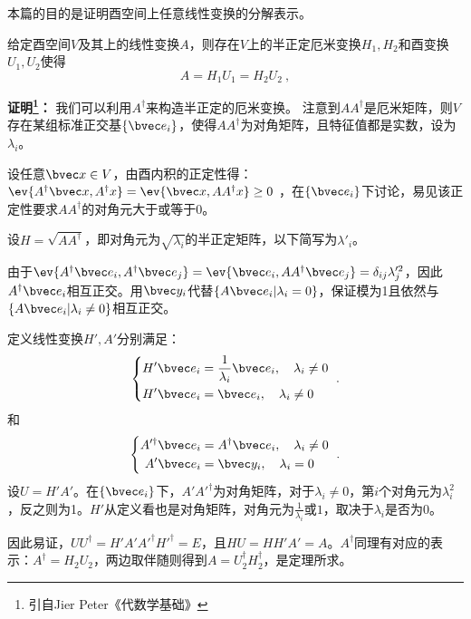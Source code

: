 本篇的目的是证明酉空间上任意线性变换的分解表示。
\begin{theorem}{}\label{the_PoDe_2}
给定酉空间$V$及其上的线性变换$A$，则存在$V$上的半正定厄米变换$H_1,H_2$和酉变换$U_1,U_2$使得
\begin{equation}
A=H_1U_1=H_2U_2~,
\end{equation}
\end{theorem}
\textbf{证明\footnote{引自Jier Peter《代数学基础》}：}
我们可以利用$A^{\dagger}$来构造半正定的厄米变换。
注意到$AA^{\dagger}$是厄米矩阵，则$V$存在某组标准正交基$\{\bvec e_i\}$，使得$AA^{\dagger}$为对角矩阵，且特征值都是实数，设为$\lambda_i$。

设任意$\bvec x\in V$，由酉内积的正定性得：$\ev{A^{\dagger}\bvec x,A^{\dagger}x}=\ev{\bvec x,AA^{\dagger}x}\ge 0$
，在$\{\bvec e_i\}$下讨论，易见该正定性要求$AA^{\dagger}$的对角元大于或等于0。

设$H=\sqrt{AA^{\dagger}}$，即对角元为$\sqrt{\lambda_i}$的半正定矩阵，以下简写为$\lambda'_i$。

由于$\ev{A^{\dagger}\bvec e_i,A^{\dagger}\bvec e_j}=\ev{\bvec e_i,AA^{\dagger}\bvec e_j}=\delta_{ij}\lambda'^2_j$，因此$A^{\dagger}\bvec e_i$相互正交。用$\bvec y_i$代替$\{A\bvec e_i|\lambda_i=0\}$，保证模为1且依然与$\{A\bvec e_i|\lambda_i\neq 0\}$相互正交。

定义线性变换$H',A'$分别满足：
\begin{equation}
\left\{
    \begin{aligned}
    H'\bvec e_i&=\frac{1}{\lambda_i}\bvec e_i,\quad\lambda_i\neq 0\\
    H'\bvec e_i&=\bvec e_i,\quad\lambda_i\neq 0
    \end{aligned}
    \right.~.
\end{equation}
和
\begin{equation}
\left\{
    \begin{aligned}
    A'^{\dagger}\bvec e_i&=A^{\dagger}\bvec e_i,\quad\lambda_i\neq 0\\
    A'\bvec e_i&=\bvec y_i,\quad\lambda_i= 0
    \end{aligned}
    \right.~.
\end{equation}
设$U=H'A'$。在$\{\bvec e_i\}$下，$A'A'^{\dagger}$为对角矩阵，对于$\lambda_i\neq 0$，第$i$个对角元为$\lambda_i^2$，反之则为1。$H'$从定义看也是对角矩阵，对角元为$\frac{1}{\lambda_i}$或$1$，取决于$\lambda_i$是否为0。

因此易证，$UU^{\dagger}=H'A'A'^{\dagger}H'^{\dagger}=E$，且$HU=HH'A'=A$。$A^{\dagger}$同理有对应的表示：$A^{\dagger}=H_2U_2$，两边取伴随则得到$A=U_2^{\dagger}H^{\dagger}_2$，是定理所求。


